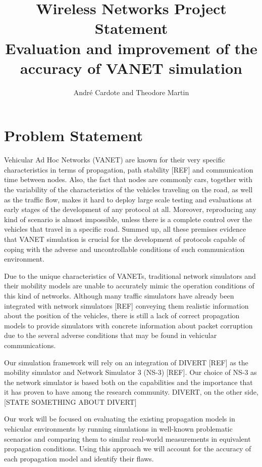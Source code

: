 \documentclass[12pt]{article}
\title{\vspace{-14ex} {\small \textbf{Wireless Networks Project Statement}} \\
		\vspace {3ex} Evaluation and improvement of the accuracy of VANET simulation}
\author{\small Andr\'e Cardote and Theodore Martin}
\date{}
\begin{document}
  \maketitle 
  
\section{Problem Statement}
Vehicular Ad Hoc Networks (VANET) are known for their very specific characteristics in terms of propagation, path stability [REF] and communication time between nodes. Also, the fact that nodes are commonly cars, together with the variability of the characteristics of the vehicles traveling on the road, as well as the traffic flow, makes it hard to deploy large scale testing and evaluations at early stages of the development of any protocol at all. Moreover, reproducing any kind of scenario is almost impossible, unless there is a complete control over the vehicles that travel in a specific road. Summed up, all these premises evidence that VANET simulation is crucial for the development of protocols capable of coping with the adverse and uncontrollable conditions of such communication environment.

Due to the unique characteristics of VANETs, traditional network simulators and their mobility models are unable to accurately mimic the operation conditions of this kind of networks. Although many traffic simulators have already been integrated with network simulators [REF] conveying them realistic information about the position of the vehicles, there is still a lack of correct propagation models to provide simulators with concrete information about packet corruption due to the several adverse conditions that may be found in vehicular communications.

Our simulation framework will rely on an integration of DIVERT [REF] as the mobility simulator and Network Simulator 3 (NS-3) [REF]. Our choice of NS-3 as the network simulator is based both on the capabilities and the importance that it has proven to have among the research community. DIVERT, on the other side, [STATE SOMETHING ABOUT DIVERT]

Our work will be focused on evaluating the existing propagation models in vehicular environments by running simulations in well-known problematic scenarios and comparing them to similar real-world measurements in equivalent propagation conditions. Using this approach we will account for the accuracy of each propagation model and identify their flaws.
\end{document}

